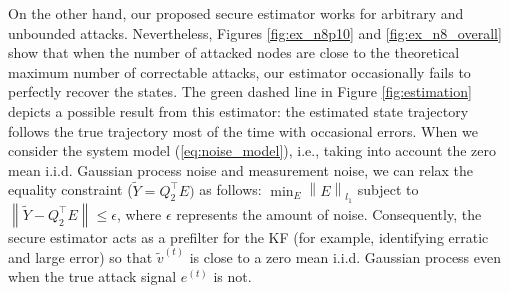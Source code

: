 \documentclass[../../thesis.tex]{subfiles}
\newcommand{\norm}[1]{\left\lVert#1\right\rVert}
\begin{document}
On the other hand, our proposed secure estimator works for arbitrary and unbounded attacks.
Nevertheless, Figures \ref{fig:ex_n8p10} and \ref{fig:ex_n8_overall} show that when the number of attacked nodes are close to the theoretical maximum number of correctable attacks, our estimator occasionally fails to perfectly recover the states.
The green dashed line in Figure \ref{fig:estimation} depicts a possible result from this estimator: the estimated state trajectory follows the true trajectory most of the time with occasional errors.
When we consider the system model (\ref{eq:noise_model}), i.e., taking into account the zero mean i.i.d. Gaussian process noise and measurement noise, we can relax the equality constraint ($\tilde Y = Q_2 ^\top E)$ as follows: $\min_E \norm{E}_{l_1}$ subject to $\norm { \tilde Y - Q_2^\top E}\le \epsilon$, where $\epsilon$ represents the amount of noise. Consequently, the secure estimator acts as a prefilter for the KF (for example, identifying erratic and large error) so that $\tilde v^{(t)}$ is close to a zero mean i.i.d. Gaussian process even when the true attack signal $e^{(t)}$ is not.
\end{document}
